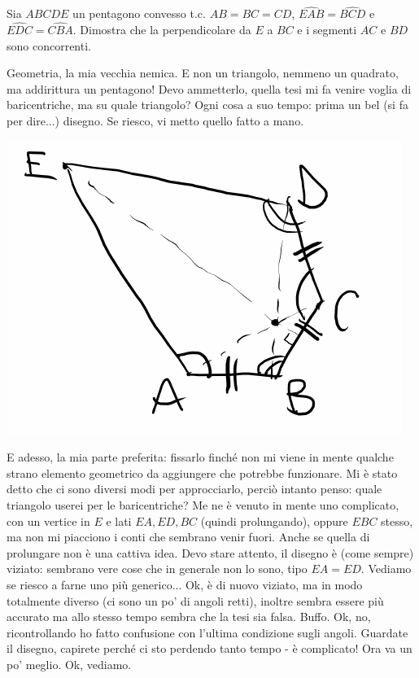 \begin{prob}
  Sia $ABCDE$ un pentagono convesso t.c. $AB=BC=CD$, $\widehat{EAB}=\widehat{BCD}$ e $\widehat{EDC}=\widehat{CBA}$. Dimostra che la perpendicolare da $E$ a $BC$ e i segmenti $AC$ e $BD$ sono concorrenti.
\end{prob}

\begin{sol}
  Geometria, la mia vecchia nemica. E non un triangolo, nemmeno un quadrato, ma addirittura un pentagono! Devo ammetterlo, quella tesi mi fa venire voglia di baricentriche, ma su quale triangolo? Ogni cosa a suo tempo: prima un bel (si fa per dire...) disegno. Se riesco, vi metto quello fatto a mano. \\

  \begin{center}
    \includegraphics{secs/G1/G1-1.pdf}
  \end{center}

  E adesso, la mia parte preferita: fissarlo finché non mi viene in mente qualche strano elemento geometrico da aggiungere che potrebbe funzionare. Mi è stato detto che ci sono diversi modi per approcciarlo, perciò intanto penso: quale triangolo userei per le baricentriche? Me ne è venuto in mente uno complicato, con un vertice in $E$ e lati $EA, ED, BC$ (quindi prolungando), oppure $EBC$ stesso, ma non mi piacciono i conti che sembrano venir fuori. Anche se quella di prolungare non è una cattiva idea. Devo stare attento, il disegno è (come sempre) viziato: sembrano vere cose che in generale non lo sono, tipo $EA=ED$. Vediamo se riesco a farne uno più generico... Ok, è di nuovo viziato, ma in modo totalmente diverso (ci sono un po' di angoli retti), inoltre sembra essere più accurato ma allo stesso tempo sembra che la tesi sia falsa. Buffo. Ok, no, ricontrollando ho fatto confusione con l'ultima condizione sugli angoli. Guardate il disegno, capirete perché ci sto perdendo tanto tempo - è complicato! Ora va un po' meglio. Ok, vediamo.


\end{sol}
